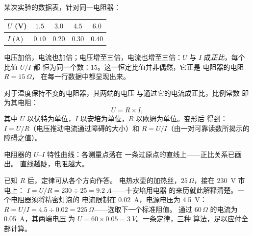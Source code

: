 \begin{example}[电阻器的“自白”]\label{ex:g8:ohms-law:confession}
某次实验的数据表，针对同一电阻器：
\begin{center}
\begin{tabular}{l|cccc}
$U$ (\unit{V}) & $1.5$ & $3.0$ & $4.5$ & $6.0$ \\
\hline
$I$ (\unit{A}) & $0.10$ & $0.20$ & $0.30$ & $0.40$
\end{tabular}
\end{center}
电压加倍，电流也加倍；电压增至三倍，电流也增至三倍：$U$ 与 $I$
成\emph{正比}，每个比值 $U/I$ 都
恒为同一个数：$15$。这一恒定比值并非偶然，它正是
电阻器的电阻 $R = 15\,\Omega$，
在每一行数据中都显现出来。
\end{example}

\begin{proposition}[欧姆定律]\label{prop:g8:ohms-law:law}
对于温度保持不变的电阻器，其两端的电压
与通过它的电流成正比，比例常数
即为其电阻：
\[
U = R \times I ,
\]
其中 $U$ 以伏特为单位，$I$ 以安培为单位，$R$ 以欧姆为单位。变形后
得到：$I = U/R$（电压推动电流通过障碍的大小）和
$R = U/I$（由一对可靠读数所揭示的
障碍之值）。
\end{proposition}

\begin{omfigure}

{\small 电阻器的 $U$--$I$ 特性曲线：各测量点落在
一条过原点的直线上——正比关系已画出。
直线越陡，电阻越大。}
\end{omfigure}

\begin{example}[定律可算出一切]\label{ex:g8:ohms-law:compute}
已知 $R$ 后，定律可从各个方向作答。
电热水壶的加热丝，$25\,\Omega$，接在 \qty{230}{V} 市电上：
$I = U/R = 230 \div 25 = \qty{9.2}{A}$——十安培用电器
的来历就此解释清楚。一个电阻器须将精密灯泡的
电流限制在 \qty{0.02}{A}，电源电压为 \qty{4.5}{V}：$R = U/I = 4.5
\div 0.02 = 225\,\Omega$——选取下一个标准阻值。
通过 $60\,\Omega$ 的电流为 \qty{0.05}{A}，其两端电压
为 $U = 60 \times 0.05 = \qty{3}{V}$。一条定律，三种
算法，足以应付全部计算。
\end{example}

